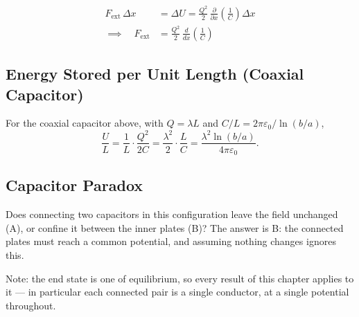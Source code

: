 \begin{align*}
  F_\text{ext}\,\Delta x &= \Delta U = \frac{Q^2}{2}\,\frac{\partial}{\partial x}\!\left(\frac{1}{C}\right)\Delta x \\[4pt]
  \implies\quad F_\text{ext} &= \frac{Q^2}{2}\,\frac{d}{dx}\!\left(\frac{1}{C}\right)
\end{align*}


\subsection{Energy Stored per Unit Length (Coaxial Capacitor)}

For the coaxial capacitor above, with $Q = \lambda L$ and $C/L = 2\pi\varepsilon_0/\ln(b/a)$,
\[
  \frac{U}{L} = \frac{1}{L}\cdot\frac{Q^2}{2C} = \frac{\lambda^2}{2}\cdot\frac{L}{C} = \frac{\lambda^2\ln(b/a)}{4\pi\varepsilon_0} .
\]

\subsection{Capacitor Paradox}

Does connecting two capacitors in this configuration leave the field unchanged (A), or confine it between the inner plates (B)? The answer is B: the connected plates must reach a common potential, and assuming nothing changes ignores this.

\medskip\noindent Note: the end state is one of equilibrium, so every result of this chapter applies to it --- in particular each connected pair is a single conductor, at a single potential throughout.
